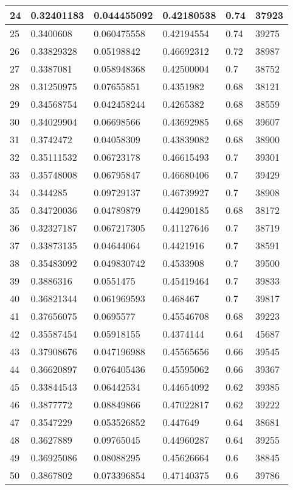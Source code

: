 \begin{longtable}{|l|l|l|l|l|l|}
24 & 0.32401183 & 0.044455092 & 0.42180538 & 0.74 & 37923 \\ \hline 
25 & 0.3400608 & 0.060475558 & 0.42194554 & 0.74 & 39275 \\ \hline 
26 & 0.33829328 & 0.05198842 & 0.46692312 & 0.72 & 38987 \\ \hline 
27 & 0.3387081 & 0.058948368 & 0.42500004 & 0.7 & 38752 \\ \hline 
28 & 0.31250975 & 0.07655851 & 0.4351982 & 0.68 & 38121 \\ \hline 
29 & 0.34568754 & 0.042458244 & 0.4265382 & 0.68 & 38559 \\ \hline 
30 & 0.34029904 & 0.06698566 & 0.43692985 & 0.68 & 39607 \\ \hline 
31 & 0.3742472 & 0.04058309 & 0.43839082 & 0.68 & 38900 \\ \hline 
32 & 0.35111532 & 0.06723178 & 0.46615493 & 0.7 & 39301 \\ \hline 
33 & 0.35748008 & 0.06795847 & 0.46680406 & 0.7 & 39429 \\ \hline 
34 & 0.344285 & 0.09729137 & 0.46739927 & 0.7 & 38908 \\ \hline 
35 & 0.34720036 & 0.04789879 & 0.44290185 & 0.68 & 38172 \\ \hline 
36 & 0.32327187 & 0.067217305 & 0.41127646 & 0.7 & 38719 \\ \hline 
37 & 0.33873135 & 0.04644064 & 0.4421916 & 0.7 & 38591 \\ \hline 
38 & 0.35483092 & 0.049830742 & 0.4533908 & 0.7 & 39500 \\ \hline 
39 & 0.3886316 & 0.0551475 & 0.45419464 & 0.7 & 39833 \\ \hline 
40 & 0.36821344 & 0.061969593 & 0.468467 & 0.7 & 39817 \\ \hline 
41 & 0.37656075 & 0.0695577 & 0.45546708 & 0.68 & 39223 \\ \hline 
42 & 0.35587454 & 0.05918155 & 0.4374144 & 0.64 & 45687 \\ \hline 
43 & 0.37908676 & 0.047196988 & 0.45565656 & 0.66 & 39545 \\ \hline 
44 & 0.36620897 & 0.076405436 & 0.45595062 & 0.66 & 39367 \\ \hline 
45 & 0.33844543 & 0.06442534 & 0.44654092 & 0.62 & 39385 \\ \hline 
46 & 0.3877772 & 0.08849866 & 0.47022817 & 0.62 & 39222 \\ \hline 
47 & 0.3547229 & 0.053526852 & 0.447649 & 0.64 & 38681 \\ \hline 
48 & 0.3627889 & 0.09765045 & 0.44960287 & 0.64 & 39255 \\ \hline 
49 & 0.36925086 & 0.08088295 & 0.45626664 & 0.6 & 38845 \\ \hline 
50 & 0.3867802 & 0.073396854 & 0.47140375 & 0.6 & 39786 \\ \hline 
\end{longtable}